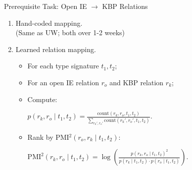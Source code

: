 \def\title{Prerequisite Task: Open IE $\rightarrow$ KBP Relations}
\begin{frame}{\title}
\begin{enumerate}
  \item Hand-coded mapping. \\
        (Same as UW; both over 1-2 weeks)
        \pause
        \vspace{1em}

  \item Learned relation mapping.
  \begin{itemize}
    \item For each type signature $t_1, t_2$;
    \item For an open IE relation $r_o$ and KBP relation $r_k$;
    \pause
    \item Compute:
      \begin{center}
        $
        p(r_k, r_o \mid t_1, t_2) = \frac{
          \textrm{count}(r_k, r_o,  t_1, t_2)
        }{
          \sum_{r_k', r_o'}\textrm{count}(r_k', r_o', t_1, t_2)
        }
        $.
      \end{center}
    \pause
    \item Rank by PMI$^2(r_o, r_k \mid t_1, t_2)$:
      \begin{center}
        $
        \textrm{PMI}^2(r_k, r_o \mid t_1, t_2) = \log \left( \frac{p(r_k, r_o \mid t_1, t_2)^2}{p(r_k \mid t_1, t_2) \cdot p(r_o \mid t_1, t_2)} \right)
        $.
      \end{center}
  \end{itemize}
\end{enumerate}
\end{frame}


